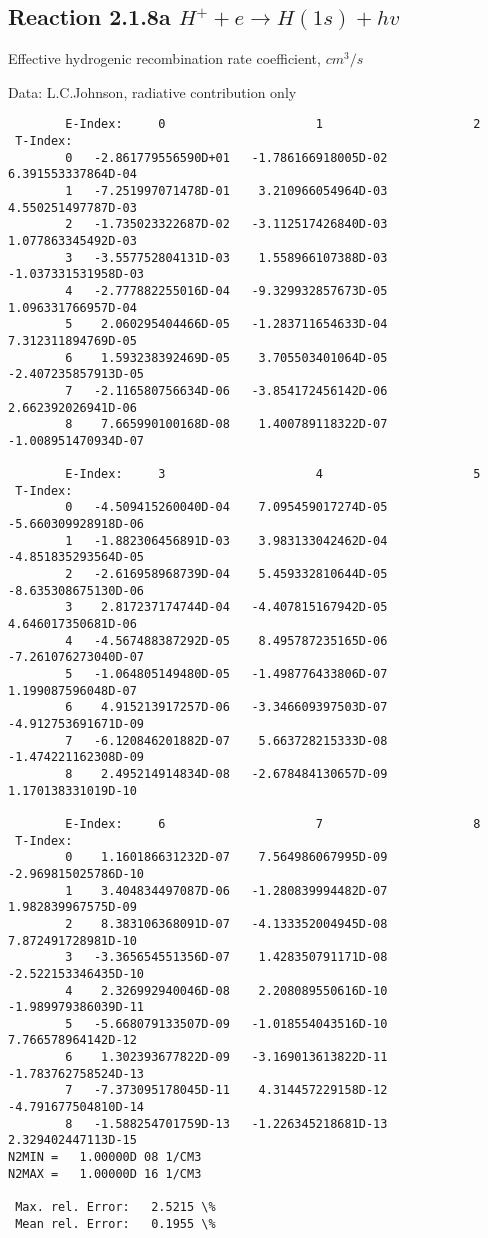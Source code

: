 \documentclass[12pt,dvipdfmx]{article}
\begin{document}
\subsection{
  Reaction 2.1.8a  $H^+ + e \rightarrow H(1s) + hv $
}

   Effective hydrogenic recombination rate coefficient, $cm^3/s$

   Data: L.C.Johnson, radiative contribution only


\begin{small}\begin{verbatim}
        E-Index:     0                     1                     2
 T-Index:
        0   -2.861779556590D+01   -1.786166918005D-02    6.391553337864D-04
        1   -7.251997071478D-01    3.210966054964D-03    4.550251497787D-03
        2   -1.735023322687D-02   -3.112517426840D-03    1.077863345492D-03
        3   -3.557752804131D-03    1.558966107388D-03   -1.037331531958D-03
        4   -2.777882255016D-04   -9.329932857673D-05    1.096331766957D-04
        5    2.060295404466D-05   -1.283711654633D-04    7.312311894769D-05
        6    1.593238392469D-05    3.705503401064D-05   -2.407235857913D-05
        7   -2.116580756634D-06   -3.854172456142D-06    2.662392026941D-06
        8    7.665990100168D-08    1.400789118322D-07   -1.008951470934D-07

        E-Index:     3                     4                     5
 T-Index:
        0   -4.509415260040D-04    7.095459017274D-05   -5.660309928918D-06
        1   -1.882306456891D-03    3.983133042462D-04   -4.851835293564D-05
        2   -2.616958968739D-04    5.459332810644D-05   -8.635308675130D-06
        3    2.817237174744D-04   -4.407815167942D-05    4.646017350681D-06
        4   -4.567488387292D-05    8.495787235165D-06   -7.261076273040D-07
        5   -1.064805149480D-05   -1.498776433806D-07    1.199087596048D-07
        6    4.915213917257D-06   -3.346609397503D-07   -4.912753691671D-09
        7   -6.120846201882D-07    5.663728215333D-08   -1.474221162308D-09
        8    2.495214914834D-08   -2.678484130657D-09    1.170138331019D-10

        E-Index:     6                     7                     8
 T-Index:
        0    1.160186631232D-07    7.564986067995D-09   -2.969815025786D-10
        1    3.404834497087D-06   -1.280839994482D-07    1.982839967575D-09
        2    8.383106368091D-07   -4.133352004945D-08    7.872491728981D-10
        3   -3.365654551356D-07    1.428350791171D-08   -2.522153346435D-10
        4    2.326992940046D-08    2.208089550616D-10   -1.989979386039D-11
        5   -5.668079133507D-09   -1.018554043516D-10    7.766578964142D-12
        6    1.302393677822D-09   -3.169013613822D-11   -1.783762758524D-13
        7   -7.373095178045D-11    4.314457229158D-12   -4.791677504810D-14
        8   -1.588254701759D-13   -1.226345218681D-13    2.329402447113D-15
N2MIN =   1.00000D 08 1/CM3
N2MAX =   1.00000D 16 1/CM3

 Max. rel. Error:   2.5215 \%
 Mean rel. Error:   0.1955 \%


\end{verbatim}\end{small}
\end{document}
